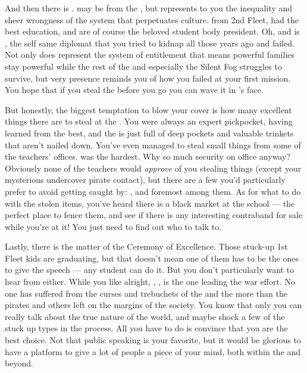 \documentclass[char]{GL2020}
\begin{document}
And then there is \cPresident{\full}. \cPresident{\they} may be from the \pShip{}, but represents to you the inequality and sheer wrongness of the system that perpetuates \pShippie{} culture.  \cPresident{\Theyare} from 2nd Fleet, had the best education, and are of course the beloved student body president. Oh, and \cPresident{\their} \cPresident{\auncle} is \cHeadDiplomat{}, the self same diplomat that you tried to kidnap all those years ago and failed.  Not only does \cPresident{} represent the system of entitlement that means powerful families stay powerful while the rest of the \pShip{} and especially the Silent Fog struggles to survive, but \cPresident{\their} very presence reminds you of how you failed at your first mission. You hope that if you steal the \iNet{} before you go you can wave it in \cPresident{}’s face.  

But honestly, the biggest temptation to blow your cover is how many excellent things there are to steal at the \pSc{}. You were always an expert pickpocket, having learned from the best, and the \pSc{} is just full of deep pockets and valuable trinkets that aren't nailed down. You've even managed to steal small things from some of the teachers' offices. \cChupInventor{\full} was the hardest. Why \cChupInventor{\do} \cChupInventor{\theyhave} so much security on \cChupInventor{\their} office anyway? Obviously none of the teachers would \emph{approve} of you stealing things (except your mysterious undercover pirate contact), but there are a few you’d particularly prefer to avoid getting caught by: \cFlowPriest{}, \cInterpol{\full} and \cPrincipal{\full} foremost among them. As for what to do with the stolen items, you've heard there is a black market at the school — the perfect place to fence them, and see if there is any interesting contraband for sale while you're at it! You just need to find out who to talk to.

Lastly, there is the matter of the Ceremony of Excellence. Those stuck-up 1st Fleet kids are graduating, but that doesn't mean one of them has to be the ones to give the speech — any student can do it. But you don't particularly want to hear from \cWarlordDaughter{\full} either. While you like \cWarlordDaughter{} alright, \cWarlordDaughter{\their} \cLoud{\parent}, \cLoud{\full}, is the one leading the war effort. No one has suffered from the curses and trebuchets of the \pFarm{} and the \pTech{} more than the pirates and others left on the margins of the \pShip{} society. You know that only you can really talk about the true nature of the world, and maybe shock a few of the stuck up types in the process. All you have to do is convince \cMusic{\full} that you are the best choice. Not that public speaking is your favorite, but it would be glorious to have a platform to give a lot of people a piece of your mind, both within the \pShippies{} and beyond.
\end{document}
